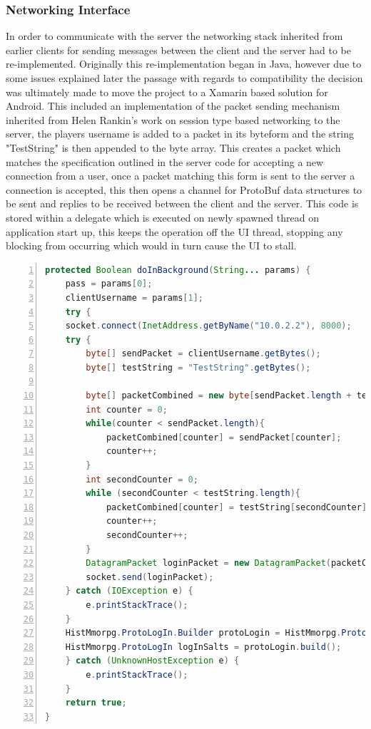 \documentclass{article}
\begin{document}
\subsubsection{Networking Interface}
In order to communicate with the server the networking stack inherited from earlier clients for sending messages between the client and the server had to be re-implemented. Originally this re-implementation began in Java, however due to some issues explained later the passage with regards to compatibility the decision was ultimately made to move the project to a Xamarin based solution for Android. This included an implementation of the packet sending mechanism inherited from Helen Rankin's\cite{helenrankin} work on session type based networking to the server, the players username is added to a packet in its byteform and the string "TestString" is then appended to the byte array. This creates a packet which matches the specification outlined in the server code for accepting a new connection from a user, once a packet matching this form is sent to the server a connection is accepted, this then opens a channel for ProtoBuf data structures to be sent and replies to be received between the client and the server. This code is stored within a delegate which is executed on newly spawned thread on application start up, this keeps the operation off the UI thread, stopping any blocking from occurring which would in turn cause the UI to stall.
\begin{lstlisting}[language=Java,breaklines=true,numbers=left,frame=single,title=LogIn Code,basicstyle=\linespread{0.5}]
protected Boolean doInBackground(String... params) {
	pass = params[0];
	clientUsername = params[1];
	try {
	socket.connect(InetAddress.getByName("10.0.2.2"), 8000);
	try {
		byte[] sendPacket = clientUsername.getBytes();
		byte[] testString = "TestString".getBytes();

		byte[] packetCombined = new byte[sendPacket.length + testString.length];
		int counter = 0;
		while(counter < sendPacket.length){
			packetCombined[counter] = sendPacket[counter];
			counter++;
		}
		int secondCounter = 0;
		while (secondCounter < testString.length){
			packetCombined[counter] = testString[secondCounter];
			counter++;
			secondCounter++;
		}
		DatagramPacket loginPacket = new DatagramPacket(packetCombined, packetCombined.length);
		socket.send(loginPacket);
	} catch (IOException e) {
		e.printStackTrace();
	}
	HistMmorpg.ProtoLogIn.Builder protoLogin = HistMmorpg.ProtoLogIn.newBuilder();
	HistMmorpg.ProtoLogIn logInSalts = protoLogin.build();
	} catch (UnknownHostException e) {
		e.printStackTrace();
	}
	return true;
}
\end{lstlisting}
\end{document}
